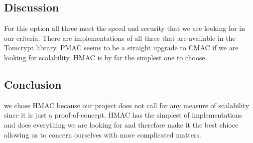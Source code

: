 \subsection{Discussion}     
For this option all three meet the speed and security that we are looking for in our criteria. There are implementations of all three that are available in the Tomcrypt library. PMAC seems to be a straight upgrade to CMAC if we are looking for scalability. HMAC is by far the simplest one to choose. 
\subsection{Conclusion}
we chose HMAC because our project does not call for any measure of scalability since it is just a proof-of-concept. HMAC has the simplest of implementations and does everything we are looking for and therefore make it the best chioce allowing us to concern ourselves with more complicated matters. 

    
\patchcmd{\thebibliography}
{}{}{}{}
    
